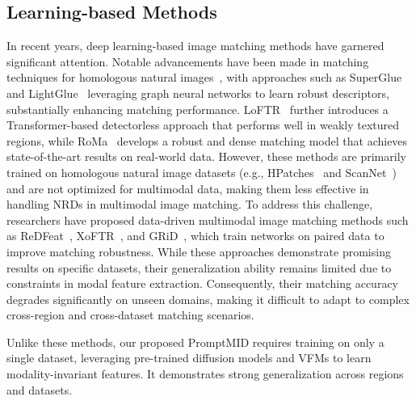 \subsection{Learning-based Methods}
In recent years, deep learning-based image matching methods have garnered significant attention. Notable advancements have been made in matching techniques for homologous natural images~\cite{mishchuk2017working,tian2020hynet,tian2019sosnet,liu2019gift}, with approaches such as SuperGlue~\cite{2019SuperGlue} and LightGlue~\cite{10377620} leveraging graph neural networks to learn robust descriptors, substantially enhancing matching performance. LoFTR~\cite{sun2021loftr} further introduces a Transformer-based detectorless approach that performs well in weakly textured regions, while RoMa~\cite{edstedt2024roma} develops a robust and dense matching model that achieves state-of-the-art results on real-world data. However, these methods are primarily trained on homologous natural image datasets (e.g., HPatches~\cite{8099893} and ScanNet~\cite{8099744}) and are not optimized for multimodal data, making them less effective in handling NRDs in multimodal image matching. To address this challenge, researchers have proposed data-driven multimodal image matching methods such as ReDFeat~\cite{9999700}, XoFTR~\cite{tuzcuouglu2024xoftr}, and GRiD~\cite{10715536}, which train networks on paired data to improve matching robustness. While these approaches demonstrate promising results on specific datasets, their generalization ability remains limited due to constraints in modal feature extraction. Consequently, their matching accuracy degrades significantly on unseen domains, making it difficult to adapt to complex cross-region and cross-dataset matching scenarios.

Unlike these methods, our proposed PromptMID requires training on only a single dataset, leveraging pre-trained diffusion models and VFMs to learn modality-invariant features. It demonstrates strong generalization across regions and datasets.

